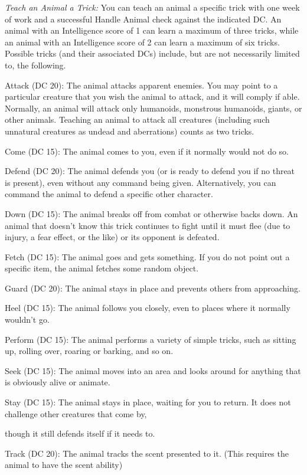 \textit{Teach an Animal a Trick:} You can teach an animal a specific trick with 
one week of work and a successful Handle Animal check against the indicated DC. 
An animal with an Intelligence score of 1 can learn a maximum of three tricks, 
while an animal with an Intelligence score of 2 can learn a maximum of six tricks. 
Possible tricks (and their associated DCs) include, but are not necessarily limited 
to, the following.

Attack (DC 20): The animal attacks apparent enemies. You may point to a particular 
creature that you wish the animal to attack, and it will comply if able. Normally, 
an animal will attack only humanoids, monstrous humanoids, giants, or other animals. 
Teaching an animal to attack all creatures (including such unnatural creatures 
as undead and aberrations) counts as two tricks.

Come (DC 15): The animal comes to you, even if it normally would not do so.

Defend (DC 20): The animal defends you (or is ready to defend you if no threat 
is present), even without any command being given. Alternatively, you can command 
the animal to defend a specific other character.

Down (DC 15): The animal breaks off from combat or otherwise backs down. An animal 
that doesn't know this trick continues to fight until it must flee (due to injury, 
a fear effect, or the like) or its opponent is defeated.

Fetch (DC 15): The animal goes and gets something. If you do not point out a specific 
item, the animal fetches some random object.

Guard (DC 20): The animal stays in place and prevents others from approaching.

Heel (DC 15): The animal follows you closely, even to places where it normally 
wouldn't go.

Perform (DC 15): The animal performs a variety of simple tricks, such as sitting 
up, rolling over, roaring or barking, and so on.

Seek (DC 15): The animal moves into an area and looks around for anything that 
is obviously alive or animate.

Stay (DC 15): The animal stays in place, waiting for you to return. It does not 
challenge other creatures that come by,

though it still defends itself if it needs to.

Track (DC 20): The animal tracks the scent presented to it. (This requires the 
animal to have the scent ability)

